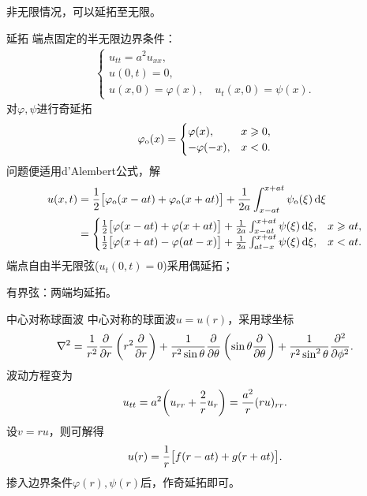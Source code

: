 非无限情况，可以延拓至无限。
\begin{example}{延拓}{}
	端点固定的半无限边界条件：
	\begin{align*}
		\begin{cases}
			u_{tt}=a^2u_{xx},\\
			u(0,t)=0,\\
			u(x,0)=\varphi(x),\quad u_t(x,0)=\psi(x).
		\end{cases}
	\end{align*}
	对$\varphi,\psi$进行奇延拓
	\begin{align*}
		\varphi_\odd(x)=
		\begin{cases}
			\varphi(x),   & x\geqslant 0, \\
			-\varphi(-x), & x<0.
		\end{cases}
	\end{align*}
	问题便适用d'Alembert公式，解
	\begin{align*}
		u(x,t) & =\frac12\bigfkh{\varphi_\odd(x-at)+\varphi_\odd(x+at)}+\frac1{2a}\int_{x-at}^{x+at}\psi_\odd(\xi)\d\xi \\
			   & = 
		\begin{cases}
			\frac12\bigfkh{\varphi(x-at)+\varphi(x+at)}+\frac1{2a}\int_{x-at}^{x+at}\psi(\xi)\d\xi, & x\geqslant at, \\
			\frac12\bigfkh{\varphi(x+at)-\varphi(at-x)}+\frac1{2a}\int_{at-x}^{x+at}\psi(\xi)\d\xi, & x<at.
		\end{cases}
	\end{align*}
	\tcblower
	端点自由半无限弦($u_t(0,t)=0$)采用偶延拓；
	
	有界弦：两端均延拓。
\end{example}
\begin{example}{中心对称球面波}{}
	中心对称的球面波$u=u(r)$，采用球坐标
	\[
		\lap=\frac1{r^2}\pp r\kh{r^2\pp r}+\frac1{r^2\sin\theta}\pp \theta\kh{\sin\theta\pp \theta}+\frac1{r^2\sin^2\theta}\pp[2]\phi.
	\]
	波动方程变为
	\[
		u_{tt}=a^2\biggkh{u_{rr}+\frac2ru_r}=\frac{a^2}r(ru)_{rr}.
	\]
	设$v=ru$，则可解得
	\[
		u(r)=\frac1r\bigfkh{f(r-at)+g(r+at)}.
	\]
	掺入边界条件$\varphi(r),\psi(r)$后，作奇延拓即可。
\end{example}
